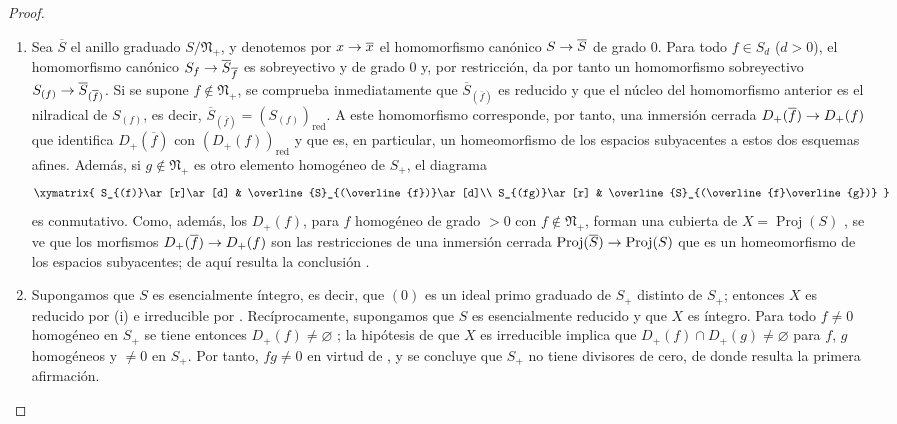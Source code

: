 \documentclass[oneside,10pt]{amsart}
\makeatletter
\newcommand{\ega@arrow}[2]{\mathchoice{#1}{#2}{#2}{#2}}
\renewcommand{\to}{\ega@arrow{\longrightarrow}{\rightarrow}}
\makeatother
\begin{document}
\begin{proof}
\medskip\noindent
\begin{enumerate}
  \item[\rm(i)] Sea $\overline{S}$ el anillo graduado $S/\mathfrak{N}_+$, y denotemos por $x\to\overline{x}$ el homomorfismo canónico $S\to\overline{S}$ de grado $0$.
  Para todo $f\in S_d$ ($d>0$), el homomorfismo canónico $S_f\to\overline{S}_{\overline{f}}$  es sobreyectivo y de grado $0$ y, por restricción, da por tanto un homomorfismo sobreyectivo $S_{(f)}\to\overline{S}_{(\overline{f})}$.
  Si se supone $f\notin\mathfrak{N}_+$, se comprueba inmediatamente que $\overline{S}_{(\overline{f})}$ es reducido y que el núcleo del homomorfismo anterior es el nilradical de $S_{(f)}$, es decir,
  $\overline{S}_{(\overline{f})}=(S_{(f)})_{\mathrm{red}}$.
  A este homomorfismo corresponde, por tanto, una inmersión cerrada $D_+(\overline{f})\to D_+(f)$ que identifica $D_+(\overline{f})$ con $(D_+(f))_{\mathrm{red}}$  y que es, en particular, un homeomorfismo de los espacios subyacentes a estos dos esquemas afines.
  Además, si $g\notin\mathfrak{N}_+$ es otro elemento homogéneo de $S_+$, el diagrama
  \[
      \xymatrix{
        S_{(f)}\ar[r]\ar[d]
        & \overline{S}_{(\overline{f})}\ar[d]\\
        S_{(fg)}\ar[r]
        & \overline{S}_{(\overline{f}\overline{g})}
      }
    \]
  es conmutativo.
  Como, además, los $D_+(f)$, para $f$ homogéneo de grado $>0$ con $f\notin\mathfrak{N}_+$, forman una cubierta de $X=\operatorname{Proj}(S)$ , se ve que los morfismos $D_+(\overline{f})\to D_+(f)$ son las restricciones de una inmersión cerrada $\operatorname{Proj}(\overline{S})\to\operatorname{Proj}(S)$ que es un homeomorfismo de los espacios subyacentes; de aquí resulta la conclusión .
  \item[\rm(ii)] Supongamos que $S$ es esencialmente íntegro, es decir, que $(0)$ es un ideal primo graduado de $S_+$ distinto de $S_+$; entonces $X$ es reducido por (i) e irreducible por .
  Recíprocamente, supongamos que $S$ es esencialmente reducido y que $X$ es íntegro.
  Para todo $f\neq0$ homogéneo en $S_+$ se tiene entonces $D_+(f)\neq\varnothing$ ; la hipótesis de que $X$ es irreducible implica que $D_+(f)\cap D_+(g)\neq\varnothing$ para $f$, $g$ homogéneos y $\neq0$ en $S_+$.
  Por tanto, $fg\neq0$ en virtud de , y se concluye que $S_+$ no tiene divisores de cero, de donde resulta la primera afirmación.
\end{enumerate}
\end{proof}
\end{document}
